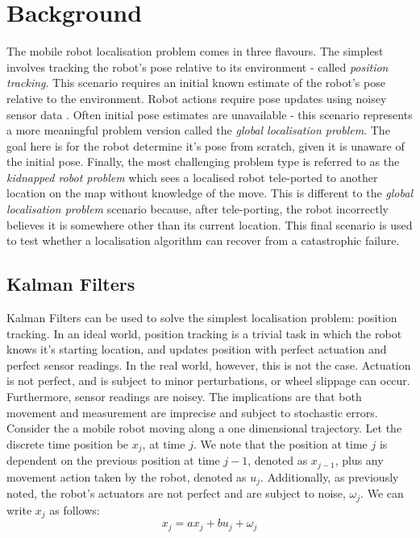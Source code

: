 \documentclass[a4paper]{article}
\begin{document}
\section{Background}
The mobile robot localisation problem comes in three flavours. The simplest involves tracking the robot's pose relative to its environment - called \textit{position tracking}. This scenario requires an initial known estimate of the robot's pose relative to the environment. Robot actions require pose updates using noisey sensor data \cite{Thrun:1999}. Often initial pose estimates are unavailable - this scenario represents a more meaningful problem version called the \textit{global localisation problem}. The goal here is for the robot determine it's pose from scratch, given it is unaware of the initial pose. Finally, the most challenging problem type is referred to as the \textit{kidnapped robot problem} which sees a localised robot tele-ported to another location on the map without knowledge of the move. This is different to the \textit{global localisation problem} scenario because, after tele-porting, the robot incorrectly believes it is somewhere other than its current location. This final scenario is used to test whether a localisation algorithm can recover from a catastrophic failure.

\subsection{Kalman Filters}
Kalman Filters can be used to solve the simplest localisation problem: position tracking. In an ideal world, position tracking is a trivial task in which the robot knows it's starting location, and updates position with perfect actuation and perfect sensor readings. In the real world, however, this is not the case. Actuation is not perfect, and is subject to minor perturbations, or wheel slippage can occur. Furthermore, sensor readings are noisey. The implications are that both movement and measurement are imprecise and subject to stochastic errors. Consider the a mobile robot moving along a one dimensional trajectory. Let the discrete time position be $x_j$, at time $j$. We note that the position at time $j$ is dependent on the previous position at time $j-1$, denoted as $x_{j-1}$, plus any movement action taken by the robot, denoted as $u_j$. Additionally, as previously noted, the robot's actuators are not perfect and are subject to noise, $\omega_j$. We can write $x_j$ as follows:
\begin{equation}
x_j = a x_j + b u_j + \omega_j
\end{equation}
\end{document}
